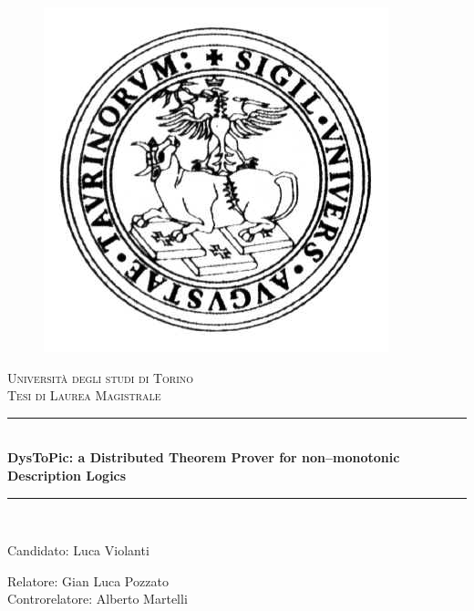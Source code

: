 \documentclass[a4paper, 11pt, oneside]{elsarticle}
\newcommand{\HRule}{\rule{\linewidth}{0.5mm}}
\begin{document}
\begin{titlepage}
\begin{center}

\begin{figure}[htp]
\centering
\includegraphics[scale=0.25]{img/logo_unito.png}
\label{}
\end{figure}

\textsc{\LARGE Università degli studi di Torino}\\[2cm]
\textsc{\Large Tesi di Laurea Magistrale}\\[3cm]


\HRule \\[0.4cm]
{ \huge \bfseries DysToPic: a Distributed Theorem Prover for non--monotonic Description Logics}\\[0.2cm]
\HRule \\[3cm]

\vfill

\begin{multicols}{2}
\begin{flushleft}
	{\Large Candidato: Luca Violanti}
\end{flushleft}
\columnbreak
\begin{flushright}
	{\Large Relatore: Gian Luca Pozzato\\[0.5cm]
	Controrelatore: Alberto Martelli }
\end{flushright}
\end{multicols}

\end{center}
\end{titlepage}
\newpage
\end{document}
